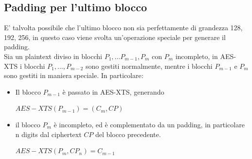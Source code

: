 \documentclass[11pt, oneside]{article}   	%
\begin{document}
\subsection*{Padding per l'ultimo blocco}
E' talvolta possibile che l'ultimo blocco non sia perfettamente di grandezza 128, 192, 256, in questo caso viene svolta un'operazione speciale per generare il padding. \\
Sia un plaintext diviso in blocchi $P_1, ... P_{m-1}, P_m$ con $P_m$ incompleto, in AES-XTS i blocchi  $P_1, ..., P_{m-2}$ sono gestiti normalmente, mentre i blocchi $P_{m-1}$ e $P_m$ sono gestiti in maniera speciale. In particolare:
\begin{itemize}
\item Il blocco $P_{m-1}$ è passato in AES-XTS, generando 
\begin{center}
$AES-XTS(P_{m-1}) = (C_{m}, CP)$
\end{center}
\item il blocco $P_{m}$ è incompleto, ed è complementato da un padding, in particolare n digits dal ciphertext $CP$ del blocco precedente.
\begin{center}
$AES-XTS(P_m, CP_n) = C_{m-1}$
\end{center}\end{itemize}
\end{document}
